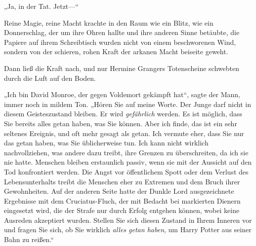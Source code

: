 „Ja, in der Tat. Jetzt—“

Reine Magie, reine Macht krachte in den Raum wie ein Blitz, wie ein Donnerschlag, der um ihre Ohren hallte und ihre anderen Sinne betäubte, die Papiere auf ihrem Schreibtisch wurden nicht von einem beschworenen Wind, sondern von der schieren, rohen Kraft der arkanen Macht beiseite geweht.

Dann ließ die Kraft nach, und nur Hermine Grangers Totenscheine schwebten durch die Luft auf den Boden.

„Ich bin David Monroe, der gegen Voldemort gekämpft hat“, sagte der Mann, immer noch in mildem Ton. „Hören Sie auf meine Worte. Der Junge darf nicht in diesem Geisteszustand bleiben. Er wird \emph{gefährlich} werden. Es ist möglich, dass Sie bereits alles getan haben, was Sie können. Aber ich finde, das ist ein sehr seltenes Ereignis, und oft mehr gesagt als getan. Ich vermute eher, dass Sie nur das getan haben, was Sie üblicherweise tun. Ich kann nicht wirklich nachvollziehen, was andere dazu treibt, ihre Grenzen zu überschreiten, da ich sie nie hatte. Menschen bleiben erstaunlich passiv, wenn sie mit der Aussicht auf den Tod konfrontiert werden. Die Angst vor öffentlichem Spott oder dem Verlust des Lebensunterhalts treibt die Menschen eher zu Extremen und dem Bruch ihrer Gewohnheiten. Auf der anderen Seite hatte der Dunkle Lord ausgezeichnete Ergebnisse mit dem Cruciatus-Fluch, der mit Bedacht bei markierten Dienern eingesetzt wird, die der Strafe nur durch Erfolg entgehen können, wobei keine Ausreden akzeptiert wurden. Stellen Sie sich diesen Zustand in Ihrem Inneren vor und fragen Sie sich, ob Sie wirklich \emph{alles getan haben}, um Harry Potter aus seiner Bahn zu reißen.“

